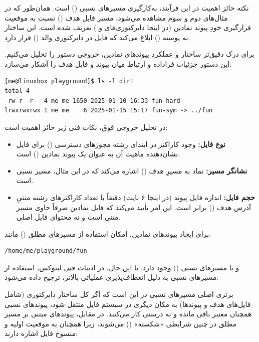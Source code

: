 نکته حائز اهمیت در این فرآیند، به‌کارگیری مسیرهای نسبی () است. همان‌طور که در مثال‌های دوم و سوم مشاهده می‌شود، مسیر فایل هدف () نسبت به موقعیت قرارگیری خودِ پیوند نمادین (در اینجا دایرکتوری‌های  و ) تعریف شده است. این ساختار به پوسته () ابلاغ می‌کند که فایل  در دایرکتوری والد () قرار دارد.

برای درک دقیق‌تر ساختار و عملکرد پیوندهای نمادین، خروجی دستور  را تحلیل می‌کنیم. این دستور جزئیات فراداده و ارتباط میان پیوند و فایل هدف را آشکار می‌سازد:

\begin{latin}
\begin{lstlisting}
[me@linuxbox playground]$ ls -l dir1
total 4
-rw-r--r-- 4 me me 1650 2025-01-10 16:33 fun-hard
lrwxrwxrwx 1 me me    6 2025-01-15 15:17 fun-sym -> ../fun
\end{lstlisting}
\end{latin}

در تحلیل خروجی فوق، نکات فنی زیر حائز اهمیت است:

\begin{itemize}
  \item \textbf{نوع فایل:} وجود کاراکتر  در ابتدای رشته مجوزهای دسترسی () برای فایل  نشان‌دهنده ماهیت آن به عنوان یک پیوند نمادین () است.
  \item \textbf{نشانگر مسیر:} نماد \cmd{->} به مسیرِ هدف () اشاره می‌کند که در این مثال، مسیر نسبی  است.
  \item \textbf{حجم فایل:} اندازه فایل پیوند (در اینجا ۶ بایت) دقیقاً با تعداد کاراکترهای رشته متنیِ آدرس هدف () برابر است. این امر تأیید می‌کند که فایل نمادین صرفاً حاوی مسیر متنی است و نه محتوای فایل اصلی.
\end{itemize}

برای ایجاد پیوندهای نمادین، امکان استفاده از مسیرهای مطلق () مانند:

\begin{latin}
\begin{lstlisting}
/home/me/playground/fun
\end{lstlisting}
\end{latin}

و یا مسیرهای نسبی () وجود دارد. با این حال، در ادبیات فنی لینوکس، استفاده از مسیرهای نسبی به دلیل انعطاف‌پذیری عملیاتی بالاتر، ترجیح داده می‌شود.

برتری اصلی مسیرهای نسبی در این است که اگر کل ساختار دایرکتوری (شامل فایل‌های هدف و پیوندها) به مکان دیگری در سیستم‌ فایل منتقل شود، پیوندهای نسبی همچنان معتبر باقی مانده و به درستی کار می‌کنند. در مقابل، پیوندهای مبتنی بر مسیر مطلق در چنین شرایطی «شکسته» () می‌شوند، زیرا همچنان به موقعیت اولیه و منسوخ فایل اشاره دارند:

